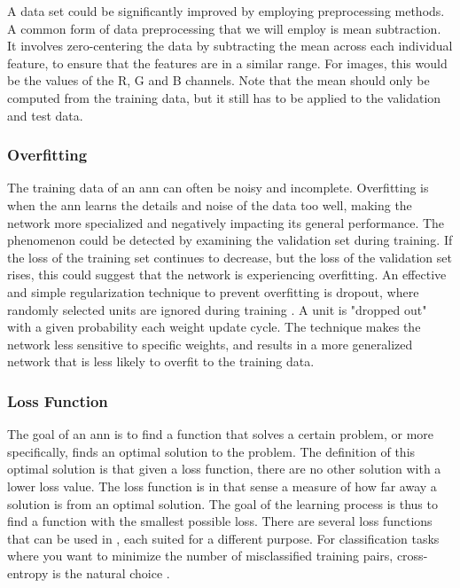 A data set could be significantly improved by employing preprocessing methods. A common form of data preprocessing that we will employ is mean subtraction. It involves zero-centering the data by subtracting the mean across each individual feature, to ensure that the features are in a similar range. For images, this would be the values of the R, G and B channels. Note that the mean should only be computed from the training data, but it still has to be applied to the validation and test data.

\subsubsection{Overfitting}

The training data of an \acrshort{ann} can often be noisy and incomplete. Overfitting is when the \acrshort{ann} learns the details and noise of the data too well, making the network more specialized and negatively impacting its general performance. The phenomenon could be detected by examining the validation set during training. If the loss of the training set continues to decrease, but the loss of the validation set rises, this could suggest that the network is experiencing overfitting. An effective and simple regularization technique to prevent overfitting is dropout, where randomly selected units are ignored during training \cite{dropout}. A unit is "dropped out" with a given probability each weight update cycle. The technique makes the network less sensitive to specific weights, and results in a more generalized network that is less likely to overfit to the training data.

\subsubsection{Loss Function}

\noindent The goal of an \acrshort{ann} is to find a function that solves a certain problem, or more specifically, finds an optimal solution to the problem. The definition of this optimal solution is that given a loss function, there are no other solution with a lower loss value. The loss function is in that sense a measure of how far away a solution is from an optimal solution. The goal of the learning process is thus to find a function with the smallest possible loss. There are several loss functions that can be used in , each suited for a different purpose. For classification tasks where you want to minimize the number of misclassified training pairs, cross-entropy is the natural choice \cite{cs231n-softmax}.

